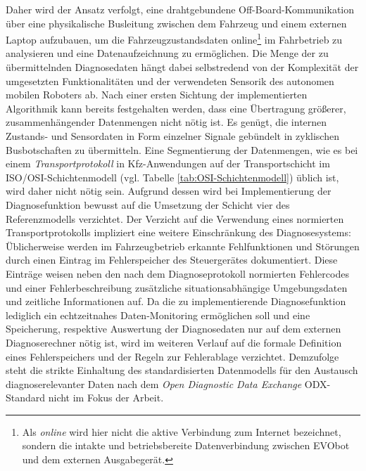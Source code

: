 Daher wird der Ansatz verfolgt, eine drahtgebundene Off-Board-Kommunikation über eine physikalische Busleitung zwischen dem Fahrzeug und einem externen Laptop aufzubauen, um die Fahrzeugzustandsdaten online\footnote{Als \emph{online} wird hier nicht die aktive Verbindung zum Internet bezeichnet, sondern die intakte und betriebsbereite Datenverbindung zwischen EVObot und dem externen Ausgabegerät.} im Fahrbetrieb zu analysieren und eine Datenaufzeichnung zu ermöglichen. Die Menge der zu übermittelnden Diagnosedaten hängt dabei selbstredend von der Komplexität der umgesetzten Funktionalitäten und der verwendeten Sensorik des autonomen mobilen Roboters ab. Nach einer ersten Sichtung der implementierten Algorithmik kann bereits festgehalten werden, dass eine Übertragung größerer, zusammenhängender Datenmengen nicht nötig ist. Es genügt, die internen Zustands- und Sensordaten in Form einzelner Signale gebündelt in zyklischen Busbotschaften zu übermitteln. Eine Segmentierung der Datenmengen, wie es bei einem \emph{Transportprotokoll} in Kfz-Anwendungen auf der Transportschicht im ISO/OSI-Schichtenmodell (vgl. Tabelle \ref{tab:OSI-Schichtenmodell}) üblich ist, wird daher nicht nötig sein. Aufgrund dessen wird bei Implementierung der Diagnosefunktion bewusst auf die Umsetzung der Schicht vier des Referenzmodells verzichtet.
Der Verzicht auf die Verwendung eines normierten Transportprotokolls impliziert eine weitere Einschränkung des Diagnosesystems: Üblicherweise werden im Fahrzeugbetrieb erkannte Fehlfunktionen und Störungen durch einen Eintrag im Fehlerspeicher des Steuergerätes dokumentiert. Diese Einträge weisen neben den nach dem Diagnoseprotokoll normierten Fehlercodes und einer Fehlerbeschreibung zusätzliche situationsabhängige Umgebungsdaten und zeitliche Informationen auf. Da die zu implementierende Diagnosefunktion lediglich ein echtzeitnahes Daten-Monitoring ermöglichen soll und eine Speicherung, respektive  Auswertung der Diagnosedaten nur auf dem externen Diagnoserechner nötig ist, wird im weiteren Verlauf auf die formale Definition eines Fehlerspeichers und der Regeln zur Fehlerablage verzichtet. Demzufolge steht die strikte Einhaltung des standardisierten Datenmodells für den Austausch diagnoserelevanter Daten nach dem \emph{Open Diagnostic Data Exchange} \acs{ODX}-Standard nicht im Fokus der Arbeit.



